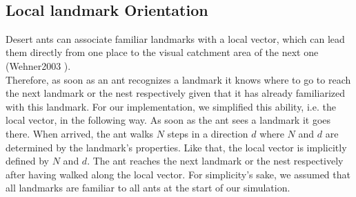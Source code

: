 \documentclass[11pt]{article}
\begin{document}
\ \\



\subsection{Local landmark Orientation}
Desert ants can associate familiar landmarks with a local vector, which can lead them directly from one place to the visual catchment area of the next one (Wehner2003 \cite{Wehner2003}).\\
Therefore, as soon as an ant recognizes a landmark it knows where to go to reach the next landmark or the nest respectively given that it has already familiarized with this landmark.  
For our implementation, we simplified this ability, i.e. the local vector, in the following way. 
As soon as the ant sees a landmark it goes there. When arrived, the ant walks $N$ steps in a direction $d$ where $N$ and $d$ are determined by the landmark’s properties. Like that, the local vector is implicitly defined by $N$ and $d$. The ant reaches the next landmark or the nest respectively after having walked along the local vector. 
For simplicity’s sake, we assumed that all landmarks are familiar to all ants at the start of our simulation.
\end{document}
